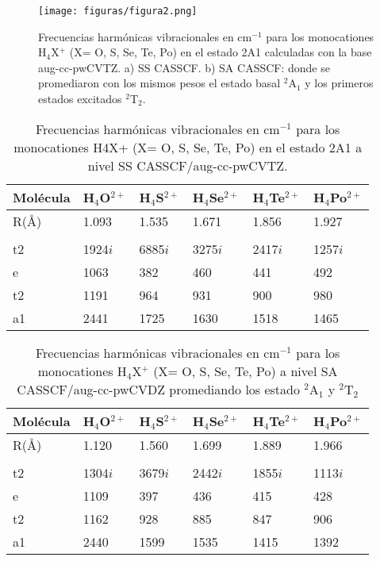 \documentclass[12pt]{report}
\begin{document}
\begin{figure}[h]
\centering
\texttt{[image: figuras/figura2.png]} 
\caption{Frecuencias harmónicas vibracionales en cm$^{-1}$ para los monocationes H$_4$X$^+$ (X= O, S, Se, Te, Po) en el estado 2A1 calculadas con la base aug-cc-pwCVTZ. a)  SS CASSCF. b) SA CASSCF: donde se promediaron con los mismos pesos el estado basal $^2$A$_1$ y los primeros estados excitados $^2$T$_2$.}
\label{rmonocationes}
\end{figure}


\begin{table}[H]
\centering	
\begin{tabular}{l|l|l|l|l|l}
\hline
 Molécula & H$_4$O$^{2+}$ & H$_4$S$^{2+}$ & H$_4$Se$^{2+}$ &  H$_4$Te$^{2+}$ & H$_4$Po$^{2+}$ \\ \hline
R(\AA) & 1.093 & 1.535 & 1.671 & 1.856 & 1.927 \\ 
 &  &  &  &  &  \\ 
 t2 & 1924$i$ & 6885$i$ & 3275$i$& 2417$i$ & 1257$i$ \\ 
e &   1063 & 382 & 460 & 441 & 492 \\ 
t2 & 1191 & 964 & 931 & 900 & 980 \\
a1 & 2441 & 1725 & 1630 & 1518 & 1465 \\ \hline
\end{tabular}
\caption {Frecuencias harmónicas vibracionales en cm$^{-1}$ para los monocationes H4X+ (X= O, S, Se, Te, Po) en el estado 2A1 a nivel SS CASSCF/aug-cc-pwCVTZ.}
\label{rmonocationest}
\end{table}



\begin{table}[H]
\centering	
\begin{tabular}{l|l|l|l|l|l}
\hline
 Molécula & H$_4$O$^{2+}$ & H$_4$S$^{2+}$ & H$_4$Se$^{2+}$ &  H$_4$Te$^{2+}$ & H$_4$Po$^{2+}$ \\ \hline
R(\AA) & 1.120 & 1.560 & 1.699 & 1.889 & 1.966 \\ 
 &  &  &  &  &  \\ 
 t2 & 1304$i$ & 3679$i$ & 2442$i$& 1855$i$ & 1113$i$ \\ 
e &   1109 & 397 & 436 & 415 & 428 \\ 
t2 & 1162 & 928 & 885 & 847 & 906 \\
a1 & 2440 & 1599 & 1535 & 1415 & 1392 \\ \hline
\end{tabular}
\caption {Frecuencias harmónicas vibracionales en cm$^{-1}$ para los monocationes H$_4$X$^+$ (X= O, S, Se, Te, Po) a nivel SA CASSCF/aug-cc-pwCVDZ promediando los estado $^2$A$_1$ y $^2$T$_2$}
\label{rmonocationest2}
\end{table}
\end{document}
